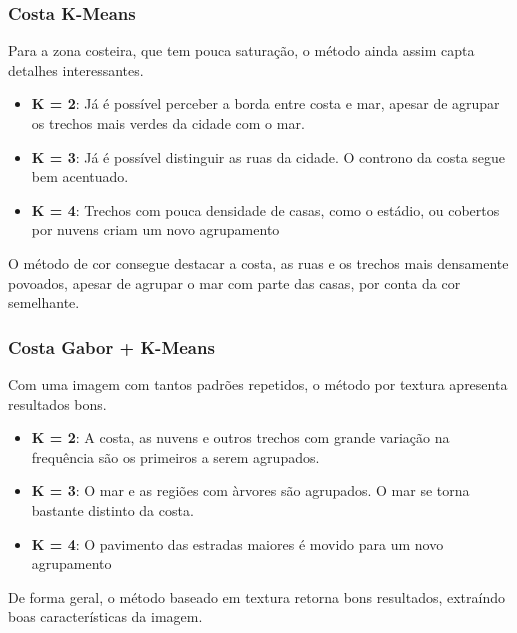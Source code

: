 \documentclass[../main.tex]{subfiles}
\begin{document}
\subsubsection{Costa K-Means}


Para a zona costeira, que tem pouca saturação, o método ainda assim capta detalhes interessantes.

\begin{itemize}
    \item \textbf{K = 2}: Já é possível perceber a borda entre costa e mar, apesar de agrupar os trechos mais verdes da cidade com o mar.
    \item \textbf{K = 3}: Já é possível distinguir as ruas da cidade. O controno da costa segue bem acentuado.
    \item \textbf{K = 4}: Trechos com pouca densidade de casas, como o estádio, ou cobertos por nuvens criam um novo agrupamento
\end{itemize}

O método de cor consegue destacar a costa, as ruas e os trechos mais densamente povoados, apesar de agrupar o mar com parte das casas, por conta da cor semelhante.

\subsubsection{Costa Gabor + K-Means}


Com uma imagem com tantos padrões repetidos, o método por textura apresenta resultados bons.

\begin{itemize}
    \item \textbf{K = 2}: A costa, as nuvens e outros trechos com grande variação na frequência são os primeiros a serem agrupados.
    \item \textbf{K = 3}: O mar e as regiões com àrvores são agrupados. O mar se torna bastante distinto da costa.
    \item \textbf{K = 4}: O pavimento das estradas maiores é movido para um novo agrupamento 
\end{itemize}

De forma geral, o método baseado em textura retorna bons resultados, extraíndo boas características da imagem. 
\end{document}
